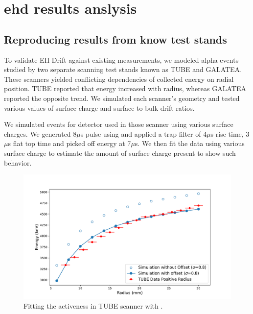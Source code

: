 \chapter{ehd results anslysis}
\label{chap:ehd_res}


\section{\label{res:1} Reproducing results from know test stands}


To validate EH-Drift against existing measurements, we modeled alpha events studied by two separate scanning test stands known as TUBE\cite{tube_paper} and GALATEA\cite{galatea_paper}. These scanners yielded conflicting dependencies of collected energy on radial position. TUBE reported that energy increased with radius, whereas GALATEA reported the opposite trend. We simulated each scanner’s geometry and tested various values of surface charge and surface-to-bulk drift ratios. 

We simulated events for detector used in those scanner using various surface charges. We generated 8$\mu$s pulse using {\tdsim} and applied a trap filter of 4$\mu$s rise time, 3$\mu$s flat top time and picked off energy at 7$\mu$s. We then fit the data using various surface charge to estimate the amount of surface charge present to show such behavior.




\begin{figure}
\includegraphics[trim={0.3cm 0.1cm 1.7cm 0.1cm},clip,width=\linewidth]{ch5/figs/tube_fit.pdf}
\caption{Fitting the activeness in TUBE scanner with \tdsim{}.}
\label{fig:tube_fit}
\end{figure}


